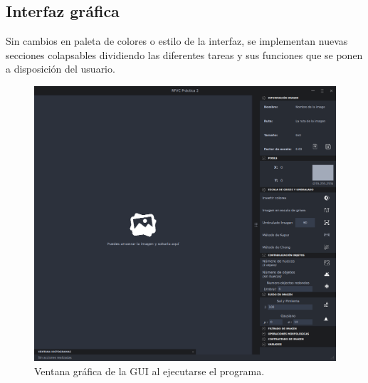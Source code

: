 \subsection*{Interfaz gráfica}
	\hfill\break
	\justifying
	Sin cambios en paleta de colores o estilo de la interfaz, se implementan nuevas secciones colapsables dividiendo las diferentes tareas y sus funciones que se ponen a disposición del usuario.
	\begin{figure}[htbp]
		\centering
		\includegraphics[width=18cm]{Imagenes/GUI.png}
		\caption{Ventana gráfica de la GUI al ejecutarse el programa.}
	\end{figure}
	